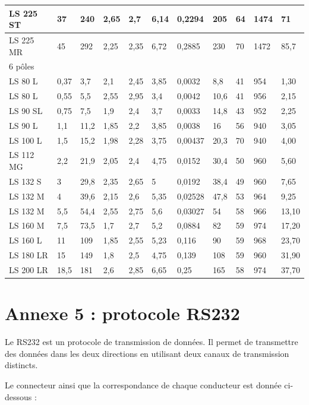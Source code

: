 \documentclass[10pt]{article}
\begin{document}
\begin{table}[h]
\begin{center}
\begin{tabular}[t]{|l|l|l|l|l|l|l|l|l|l|l|}
\hline
LS 225 ST & 37 & 240 & 2,65 & 2,7 & 6,14 & 0,2294 & 205 & 64 & 1474 & 71 \\
\hline
LS 225 MR & 45 & 292 & 2,25 & 2,35 & 6,72 & 0,2885 & 230 & 70 & 1472 & 85,7 \\
\hline
\multicolumn{11}{|l|}{6 pôles} \\
\hline
LS 80 L & 0,37 & 3,7 & 2,1 & 2,45 & 3,85 & 0,0032 & 8,8 & 41 & 954 & 1,30 \\
\hline
LS 80 L & 0,55 & 5,5 & 2,55 & 2,95 & 3,4 & 0,0042 & 10,6 & 41 & 956 & 2,15 \\
\hline
LS 90 SL & 0,75 & 7,5 & 1,9 & 2,4 & 3,7 & 0,0033 & 14,8 & 43 & 952 & 2,25 \\
\hline
LS 90 L & 1,1 & 11,2 & 1,85 & 2,2 & 3,85 & 0,0038 & 16 & 56 & 940 & 3,05 \\
\hline
LS 100 L & 1,5 & 15,2 & 1,98 & 2,28 & 3,75 & 0,00437 & 20,3 & 70 & 940 & 4,00 \\
\hline
LS 112 MG & 2,2 & 21,9 & 2,05 & 2,4 & 4,75 & 0,0152 & 30,4 & 50 & 960 & 5,60 \\
\hline
LS 132 S & 3 & 29,8 & 2,35 & 2,65 & 5 & 0,0192 & 38,4 & 49 & 960 & 7,65 \\
\hline
LS 132 M & 4 & 39,6 & 2,15 & 2,6 & 5,35 & 0,02528 & 47,8 & 53 & 964 & 9,25 \\
\hline
LS 132 M & 5,5 & 54,4 & 2,55 & 2,75 & 5,6 & 0,03027 & 54 & 58 & 966 & 13,10 \\
\hline
LS 160 M & 7,5 & 73,5 & 1,7 & 2,7 & 5,2 & 0,0884 & 82 & 59 & 974 & 17,20 \\
\hline
LS 160 L & 11 & 109 & 1,85 & 2,55 & 5,23 & 0,116 & 90 & 59 & 968 & 23,70 \\
\hline
LS 180 LR & 15 & 149 & 1,8 & 2,5 & 4,75 & 0,139 & 108 & 59 & 960 & 31,90 \\
\hline
LS 200 LR & 18,5 & 181 & 2,6 & 2,85 & 6,65 & 0,25 & 165 & 58 & 974 & 37,70 \\
\hline
\end{tabular}
\end{center}
\end{table}

\section*{Annexe 5 : protocole RS232}
Le RS232 est un protocole de transmission de données. Il permet de transmettre des données dans les deux directions en utilisant deux canaux de transmission distincts.

Le connecteur ainsi que la correspondance de chaque conducteur est donnée ci-dessous :
\end{document}
